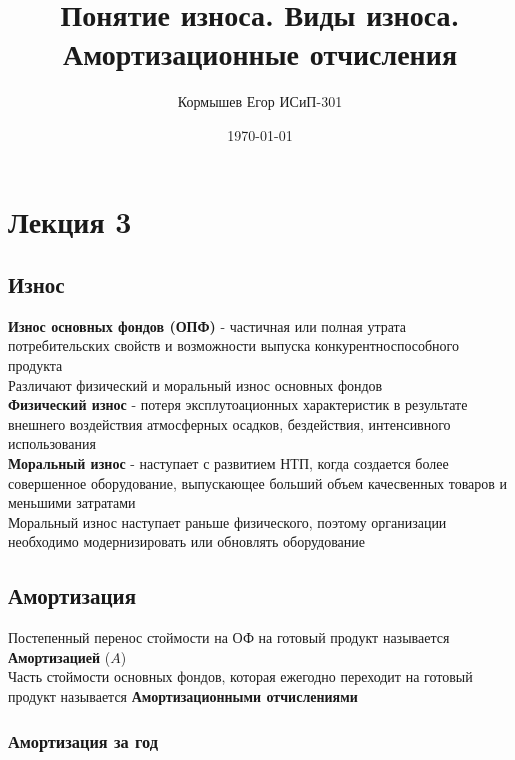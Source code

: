 \documentclass[11pt]{article}
\author{Кормышев Егор ИСиП-301}
\date{\today}
\title{Понятие износа. Виды износа. Амортизационные отчисления}
\begin{document}
\maketitle
\tableofcontents



\section{Лекция 3}
\label{sec:org2d780b8}

\subsection{Износ}
\label{sec:orgadacc9f}

\textbf{Износ основных фондов (ОПФ)} - частичная или полная утрата потребительских свойств и возможности выпуска конкурентноспособного продукта \\[0pt]


Различают физический и моральный износ основных фондов \\[0pt]


\textbf{Физический износ} - потеря эксплутоационных характеристик в результате внешнего воздействия атмосферных осадков, бездействия, интенсивного использования \\[0pt]

\textbf{Моральный износ} - наступает с развитием НТП, когда создается более совершенное оборудование, выпускающее больший объем качесвенных товаров и меньшими затратами \\[0pt]

Моральный износ наступает раньше физического, поэтому организации необходимо модернизировать или обновлять оборудование \\[0pt]

\subsection{Амортизация}
\label{sec:org3fd92e5}

Постепенный перенос стоймости на ОФ на готовый продукт называется \textbf{Амортизацией} (\(A\)) \\[0pt]

Часть стоймости основных фондов, которая ежегодно переходит на готовый продукт называется \textbf{Амортизационными отчислениями}

\subsubsection{Амортизация за год}
\label{sec:orgebcdd21}
\end{document}

